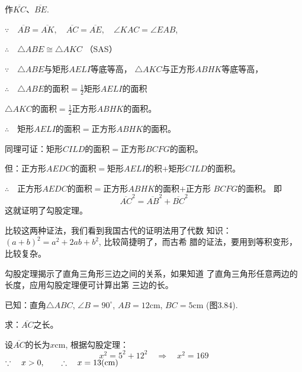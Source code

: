 作$\overline{KC}$、$\overline{BE}$.

$\because\quad \overline{AB}=\overline{AK},\quad \overline{AC}=\overline{AE},\quad \angle KAC=\angle EAB$,

$\therefore\quad \triangle ABE\cong \triangle AKC$ （SAS）

$\because\quad \triangle ABE$与矩形$AELI$等底等高，
$\triangle AKC$与正方形$ABHK$等底等高，

$\therefore\quad \triangle ABE$的面积$=\frac{1}{2}$矩形$AELI$的面积

$\triangle AKC$的面积$=\frac{1}{2}$正方形$ABHK$的面积。

$\therefore\quad $矩形$AELI$的面积$=$正方形$ABHK$的面积。

同理可证：矩形$CILD$的面积$=$正方形$BCFG$的面积。

但：正方形$AEDC$的面积$=$矩形$AELI$的积$+$矩形$CILD$的面积。

$\therefore\quad $正方形$AEDC$的面积$=$正方形$ABHK$的面积$+$正方形
$BCFG$的面积。
即
\[\overline{AC}^2=\overline{AB}^2+\overline{BC}^2\]
这就证明了勾股定理。

比较这两种证法，我们看到我国古代的证明法用了代数
知识：$(a+b)^2=a^2+2ab+b^2$, 比较简捷明了，而古希
腊的证法，要用到等积变形，比较复杂。

勾股定理揭示了直角三角形三边之间的关系，如果知道
了直角三角形任意两边的长度，应用勾股定理便可计算出第
三边的长。

\begin{example}
    已知：直角$\triangle ABC$, $\angle B=90^{\circ}$, $AB=12$cm,
$BC=5$cm (图3.84).

求：$\overline{AC}$之长。
\end{example}


\begin{solution}
    设$\overline{AC}$的长为$x$cm, 根据勾股定理：
\[x^2=5^2+12^2\quad \Rightarrow\quad x^2=169\]
$\because\quad x>0,\qquad \therefore\quad x=13({\rm cm})$
\end{solution}

\begin{figure}[htp]\centering
    \begin{minipage}[t]{0.48\textwidth}
    \centering
{}
    \caption{}
    \end{minipage}
    \begin{minipage}[t]{0.48\textwidth}
    \centering
    \caption{}
    \end{minipage}
    \end{figure}

